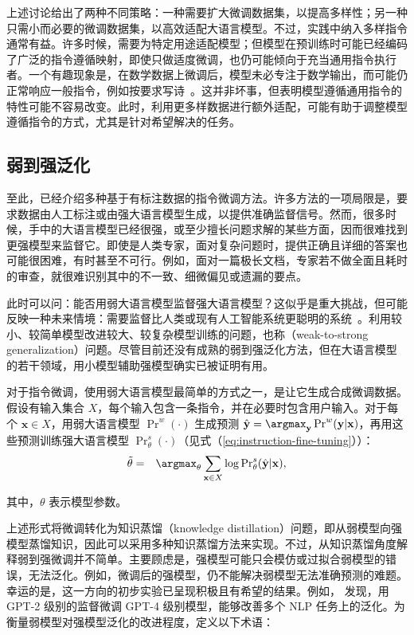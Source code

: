 上述讨论给出了两种不同策略：一种需要扩大微调数据集，以提高多样性；另一种只需小而必要的微调数据集，以高效适配大语言模型。不过，实践中纳入多样指令通常有益。许多时候，需要为特定用途适配模型；但模型在预训练时可能已经编码了广泛的指令遵循映射，即使只做适度微调，也仍可能倾向于充当通用指令执行者。一个有趣现象是，在数学数据上微调后，模型未必专注于数学输出，而可能仍正常响应一般指令，例如按要求写诗~\cite{hewitt:2024instructionblog}。这并非坏事，但表明模型遵循通用指令的特性可能不容易改变。此时，利用更多样数据进行额外适配，可能有助于调整模型遵循指令的方式，尤其是针对希望解决的任务。

\subsection{弱到强泛化}

\noindent 至此，已经介绍多种基于有标注数据的指令微调方法。许多方法的一项局限是，要求数据由人工标注或由强大语言模型生成，以提供准确监督信号。然而，很多时候，手中的大语言模型已经很强，或至少擅长问题求解的某些方面，因而很难找到更强模型来监督它。即使是人类专家，面对复杂问题时，提供正确且详细的答案也可能很困难，有时甚至不可行。例如，面对一篇极长文档，专家若不做全面且耗时的审查，就很难识别其中的不一致、细微偏见或遗漏的要点。

此时可以问：能否用弱大语言模型监督强大语言模型？这似乎是重大挑战，但可能反映一种未来情境：需要监督比人类或现有人工智能系统更聪明的系统~\cite{burns-etal:2023weakblog}。利用较小、较简单模型改进较大、较复杂模型训练的问题，也称（weak-to-strong generalization）问题。尽管目前还没有成熟的弱到强泛化方法，但在大语言模型的若干领域，用小模型辅助强模型确实已被证明有用。

对于指令微调，使用弱大语言模型最简单的方式之一，是让它生成合成微调数据。假设有输入集合 $X$，每个输入包含一条指令，并在必要时包含用户输入。对于每个 $\mathbf{x} \in X$，用弱大语言模型 $\Pr^{w}(\cdot)$ 生成预测 $\hat{\mathbf{y}} = \argmax_{\mathbf{y}} \Pr^{w}(\mathbf{y}|\mathbf{x})$，再用这些预测训练强大语言模型 $\Pr^{s}_{\theta}(\cdot)$（见式（\ref{eq:instruction-fine-tuning}））：
\begin{eqnarray}
\tilde{\theta} & = & \argmax_{\theta} \sum_{\mathbf{x} \in X} \log \mathrm{Pr}_{\theta}^{s}(\hat{\mathbf{y}}|\mathbf{x}),
\end{eqnarray}

\noindent 其中，$\theta$ 表示模型参数。

上述形式将微调转化为知识蒸馏（knowledge distillation）问题，即从弱模型向强模型蒸馏知识，因此可以采用多种知识蒸馏方法来实现。不过，从知识蒸馏角度解释弱到强微调并不简单。主要顾虑是，强模型可能只会模仿或过拟合弱模型的错误，无法泛化。例如，微调后的强模型，仍不能解决弱模型无法准确预测的难题。幸运的是，这一方向的初步实验已呈现积极且有希望的结果。例如，\citet{burns-etal:2023weak} 发现，用 GPT-2 级别的监督微调 GPT-4 级别模型，能够改善多个 NLP 任务上的泛化。为衡量弱模型对强模型泛化的改进程度，定义以下术语：

